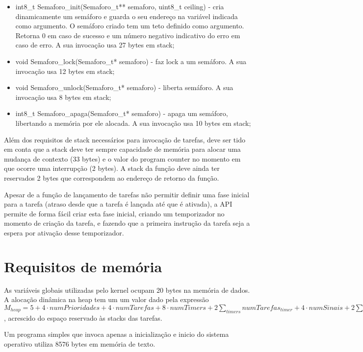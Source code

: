 \documentclass[journal]{IEEEtran}
\begin{document}
\begin{itemize}
	\item	int8\_t Semaforo\_init(Semaforo\_t** semaforo, uint8\_t ceiling) - cria dinamicamente um semáforo e guarda o seu endereço na variável indicada como argumento.
		O semáforo criado tem um teto definido como argumento. Retorna 0 em caso de sucesso e um número negativo indicativo do erro em caso de erro. A sua invocação usa
		27 bytes em stack;
	\item	void Semaforo\_lock(Semaforo\_t* semaforo) - faz lock a um semáforo. A sua invocação usa 12 bytes em stack;
	\item	void Semaforo\_unlock(Semaforo\_t* semaforo) - liberta semáforo. A sua invocação usa 8 bytes em stack;
	\item	int8\_t Semaforo\_apaga(Semaforo\_t* semaforo) - apaga um semáforo, libertando a memória por ele alocada. A sua invocação usa 10 bytes em stack;

\end{itemize}

Além dos requisitos de stack necessários para invocação de tarefas, deve ser tido em conta que a stack deve ter sempre capacidade de memória para alocar uma mudança de
contexto (33 bytes) e o valor do program counter no momento em que ocorre uma interrupção (2 bytes).
A stack da função deve ainda ter reservados 2 bytes que correspondem ao endereço de retorno da função.

Apesar de a função de lançamento de tarefas não permitir definir uma fase inicial para a tarefa (atraso desde que a tarefa é lançada até que é ativada), a API permite de
forma fácil criar esta fase inicial, criando um temporizador no momento de criação da tarefa, e fazendo que a primeira instrução da tarefa seja a espera por ativação
desse temporizador.

\section{Requisitos de memória}
As variáveis globais utilizadas pelo kernel ocupam 20 bytes na memória de dados.
A alocação dinâmica na heap tem um um valor dado pela expressão $M_{heap} = 5 + 4 \cdot numPrioridades + 4 \cdot numTarefas + 8 \cdot numTimers + 2 \sum_{timers} numTarefas_{timer} + 4 \cdot numSinais + 2 \sum_{sinais}
numTarefas_{sinal} + 5 \cdot numSemaforos $, acrescido do espaço reservado às stacks das tarefas.

Um programa simples que invoca apenas a inicialização e inicio do sistema operativo utiliza 8576 bytes em memória de texto.
\end{document}

